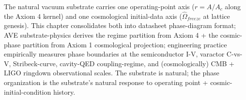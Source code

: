 \noindent
The natural vacuum substrate carries one operating-point axis ($r = A/A_c$ along the Axiom 4 kernel) and one cosmological initial-data axis ($\hat{\Omega}_{freeze}$ at lattice genesis). This chapter consolidates both into datasheet phase-diagram format; AVE substrate-physics derives the regime partition from Axiom 4 + the cosmic-phase partition from Axiom 1 cosmological projection; engineering practice empirically measures phase boundaries at the semiconductor I-V, varactor C-vs-V, Stribeck-curve, cavity-QED coupling-regime, and (cosmologically) CMB + LIGO ringdown observational scales. The substrate is natural; the phase organization is the substrate's natural response to operating point + cosmic-initial-condition history.
%
%
